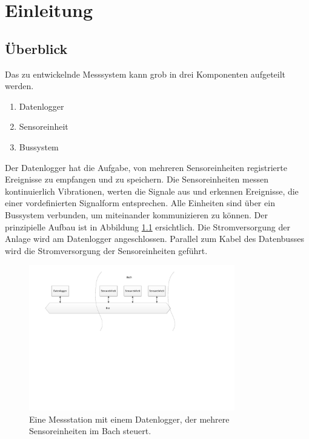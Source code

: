 %
%

\chapter{Einleitung}\label{chap.einleitung}



\section{Überblick}\label{sec.ueberblick}
Das zu entwickelnde Messsystem kann grob in drei Komponenten aufgeteilt werden. 
\begin{enumerate}
\item Datenlogger
\item Sensoreinheit
\item Bussystem
\end{enumerate}
Der Datenlogger hat die Aufgabe, von mehreren Sensoreinheiten registrierte Ereignisse zu empfangen und zu speichern. Die Sensoreinheiten messen kontinuierlich Vibrationen, werten die Signale aus und erkennen Ereignisse, die einer vordefinierten Signalform entsprechen. Alle Einheiten sind über ein Bussystem verbunden, um miteinander kommunizieren zu können. Der prinzipielle Aufbau ist in Abbildung \ref{fig.situationskroki} ersichtlich. Die Stromversorgung der Anlage wird am Datenlogger angeschlossen. Parallel zum Kabel des Datenbusses wird die Stromversorgung der Sensoreinheiten geführt.

\begin{figure}[H]
	\centering
		\includegraphics[width=0.8\textwidth]{images/visio/situationskroki.pdf}
	\caption{Eine Messstation mit einem Datenlogger, der mehrere Sensoreinheiten im Bach steuert.}
	\label{fig.situationskroki}
\end{figure}


